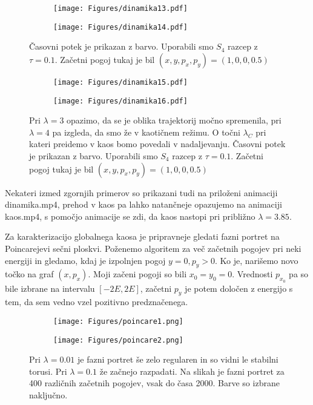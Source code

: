 \documentclass{article}
\begin{document}
\begin{figure}[H]
\centering
\begin{subfigure}{.49\textwidth}
\texttt{[image: Figures/dinamika13.pdf]}
\end{subfigure}
\begin{subfigure}{.49\textwidth}
\texttt{[image: Figures/dinamika14.pdf]}
\end{subfigure}
\caption*{Časovni potek je prikazan z barvo. Uporabili smo $S_4$ razcep z $\tau=0.1$. Začetni pogoj tukaj je bil $(x,y,p_x,p_y) = (1,0,0,0.5)$}
\end{figure}

\begin{figure}[H]
\centering
\begin{subfigure}{.49\textwidth}
\texttt{[image: Figures/dinamika15.pdf]}
\end{subfigure}
\begin{subfigure}{.49\textwidth}
\texttt{[image: Figures/dinamika16.pdf]}
\end{subfigure}
\caption*{Pri $\lambda=3$ opazimo, da se je oblika trajektorij močno spremenila, pri $\lambda=4$ pa izgleda, da smo že v kaotičnem režimu. O točni $\lambda_C$ pri kateri preidemo v kaos bomo povedali v nadaljevanju. Časovni potek je prikazan z barvo. Uporabili smo $S_4$ razcep z $\tau=0.1$. Začetni pogoj tukaj je bil $(x,y,p_x,p_y) = (1,0,0,0.5)$}
\end{figure}

Nekateri izmed zgornjih primerov so prikazani tudi na priloženi animaciji dinamika.mp4, prehod v kaos pa lahko natančneje opazujemo na animaciji kaos.mp4, s pomočjo animacije se zdi, da kaos nastopi pri približno $\lambda=3.85$.



Za karakterizacijo globalnega kaosa je pripravneje gledati fazni portret na Poincarejevi sečni ploskvi. Poženemo algoritem za več začetnih pogojev pri neki energiji in gledamo, kdaj je izpolnjen pogoj $y=0, p_y > 0$. Ko je,  narišemo novo točko na graf $(x,p_x)$. Moji začeni pogoji so bili $x_0 = y_0=0$. Vrednosti $p_{x_0}$ pa so bile izbrane na intervalu $[-2E,2E]$, začetni $p_y$ je potem določen z energijo s tem, da sem vedno vzel pozitivno predznačenega.

\begin{figure}[H]
\centering
\begin{subfigure}{.49\textwidth}
\texttt{[image: Figures/poincare1.png]}
\end{subfigure}
\begin{subfigure}{.49\textwidth}
\texttt{[image: Figures/poincare2.png]}
\end{subfigure}
\caption*{Pri $\lambda=0.01$ je fazni portret še zelo regularen in so vidni le stabilni torusi. Pri $\lambda=0.1$ že začnejo razpadati. Na slikah je fazni portret za 400 različnih začetnih pogojev, vsak do časa 2000. Barve so izbrane naključno.}
\end{figure}
\end{document}
